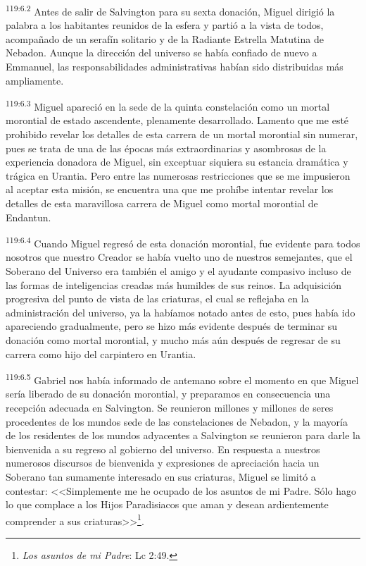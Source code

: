 \par
\textsuperscript{119:6.2} Antes de salir de Salvington para su sexta donación, Miguel dirigió la palabra a los habitantes reunidos de la esfera y partió a la vista de todos, acompañado de un serafín solitario y de la Radiante Estrella Matutina de Nebadon. Aunque la dirección del universo se había confiado de nuevo a Emmanuel, las responsabilidades administrativas habían sido distribuidas más ampliamente.

\par
\textsuperscript{119:6.3} Miguel apareció en la sede de la quinta constelación como un mortal morontial de estado ascendente, plenamente desarrollado. Lamento que me esté prohibido revelar los detalles de esta carrera de un mortal morontial sin numerar, pues se trata de una de las épocas más extraordinarias y asombrosas de la experiencia donadora de Miguel, sin exceptuar siquiera su estancia dramática y trágica en Urantia. Pero entre las numerosas restricciones que se me impusieron al aceptar esta misión, se encuentra una que me prohíbe intentar revelar los detalles de esta maravillosa carrera de Miguel como mortal morontial de Endantun.

\par
\textsuperscript{119:6.4} Cuando Miguel regresó de esta donación morontial, fue evidente para todos nosotros que nuestro Creador se había vuelto uno de nuestros semejantes, que el Soberano del Universo era también el amigo y el ayudante compasivo incluso de las formas de inteligencias creadas más humildes de sus reinos. La adquisición progresiva del punto de vista de las criaturas, el cual se reflejaba en la administración del universo, ya la habíamos notado antes de esto, pues había ido apareciendo gradualmente, pero se hizo más evidente después de terminar su donación como mortal morontial, y mucho más aún después de regresar de su carrera como hijo del carpintero en Urantia.

\par
\textsuperscript{119:6.5} Gabriel nos había informado de antemano sobre el momento en que Miguel sería liberado de su donación morontial, y preparamos en consecuencia una recepción adecuada en Salvington. Se reunieron millones y millones de seres procedentes de los mundos sede de las constelaciones de Nebadon, y la mayoría de los residentes de los mundos adyacentes a Salvington se reunieron para darle la bienvenida a su regreso al gobierno del universo. En respuesta a nuestros numerosos discursos de bienvenida y expresiones de apreciación hacia un Soberano tan sumamente interesado en sus criaturas, Miguel se limitó a contestar: <<Simplemente me he ocupado de los asuntos de mi Padre. Sólo hago lo que complace a los Hijos Paradisiacos que aman y desean ardientemente comprender a sus criaturas>>\footnote{\textit{Los asuntos de mi Padre}: Lc 2:49.}.

